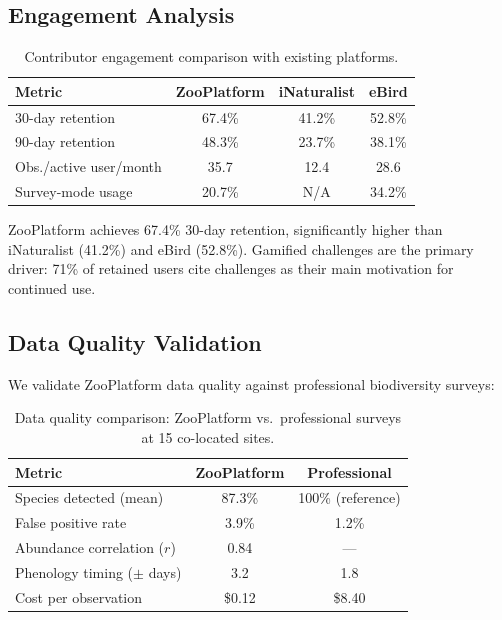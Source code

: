 \documentclass[11pt,a4paper]{article}
\begin{document}
\subsection{Engagement Analysis}

\begin{table}[H]
\centering
\caption{Contributor engagement comparison with existing platforms.}
\label{tab:engagement}
\begin{tabular}{lccc}
\toprule
\textbf{Metric} & \textbf{ZooPlatform} & \textbf{iNaturalist} &
  \textbf{eBird} \\
\midrule
30-day retention & 67.4\% & 41.2\% & 52.8\% \\
90-day retention & 48.3\% & 23.7\% & 38.1\% \\
Obs./active user/month & 35.7 & 12.4 & 28.6 \\
Survey-mode usage & 20.7\% & N/A & 34.2\% \\
\bottomrule
\end{tabular}
\end{table}

ZooPlatform achieves 67.4\% 30-day retention, significantly higher
than iNaturalist (41.2\%) and eBird (52.8\%). Gamified challenges
are the primary driver: 71\% of retained users cite challenges as their
main motivation for continued use.

\subsection{Data Quality Validation}

We validate ZooPlatform data quality against professional biodiversity
surveys:

\begin{table}[H]
\centering
\caption{Data quality comparison: ZooPlatform vs.\ professional surveys
at 15 co-located sites.}
\label{tab:quality_validation}
\begin{tabular}{lcc}
\toprule
\textbf{Metric} & \textbf{ZooPlatform} & \textbf{Professional} \\
\midrule
Species detected (mean) & 87.3\% & 100\% (reference) \\
False positive rate & 3.9\% & 1.2\% \\
Abundance correlation ($r$) & 0.84 & --- \\
Phenology timing ($\pm$ days) & 3.2 & 1.8 \\
Cost per observation & \$0.12 & \$8.40 \\
\bottomrule
\end{tabular}
\end{table}
\end{document}
